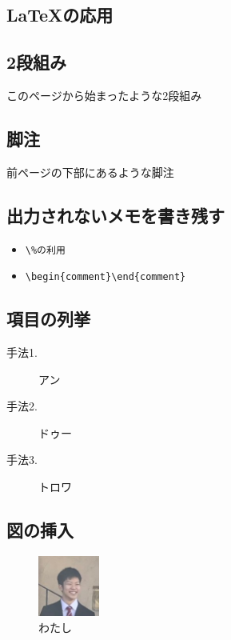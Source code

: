 \documentclass[a4paper]{jsarticle}
\begin{document}
\newpage
\begin{multicols}{2}


\section{LaTeXの応用}


\subsection{2段組み}
このページから始まったような2段組み

\subsection{脚注}
前ページの下部にあるような脚注

\subsection{出力されないメモを書き残す}
\begin{itemize}
\item \verb|\%の利用|
\item \verb|\begin{comment}\end{comment}|
\end{itemize}


\subsection{項目の列挙}
\begin{description}
\item [手法1.] アン
\item [手法2.] ドゥー
\item [手法3.] トロワ
\end{description}


\subsection{図の挿入}
\renewcommand{\figurename}{図}
\setcounter{figure}{2}
\begin{figure}[H]
 \centering
   \includegraphics[width=20mm]{figures/Sample.jpg}
 \caption{わたし}
 \label{me}
\end{figure}
\noindent


\end{multicols}
\end{document}
